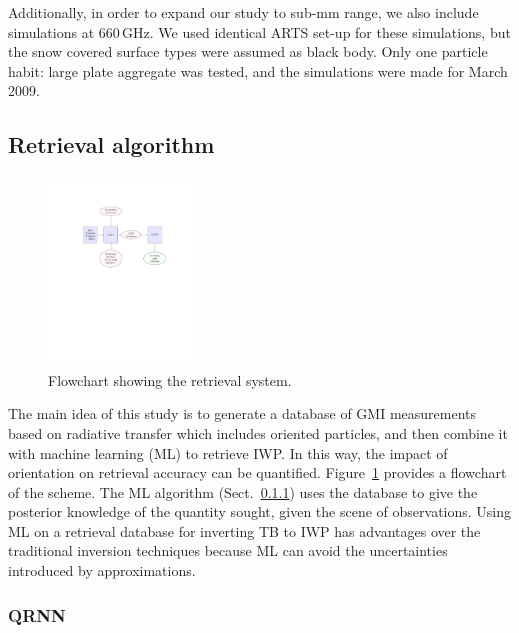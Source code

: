 \documentclass[amt, manuscript]{copernicus}
\begin{document}
Additionally, in order to expand our study to sub-mm range, we also include simulations at 660\,GHz. We used identical ARTS set-up for these simulations, but the snow covered surface types were assumed as black body. Only one particle habit: large plate aggregate was tested, and the simulations were made for March 2009.  




\subsection{Retrieval algorithm}
\label{sec:retrieval_algo}

\begin{figure}[t]
	\includegraphics[trim=100 410 100 125,clip,height = 50mm, ]{Figures/flowchart.pdf}
	\caption{Flowchart showing the retrieval system.}
	\label{fig:flowchart}
\end{figure}

The main idea of this study is to generate a database of GMI measurements based on radiative transfer which includes oriented particles, and then combine it with machine learning (ML) to retrieve IWP. In this way, the impact of orientation on retrieval accuracy can be quantified. Figure~\ref{fig:flowchart} provides a flowchart of the scheme. The ML algorithm (Sect.~\ref{sec:QRNN}) uses the database to give the posterior knowledge of the quantity sought, given the scene of observations. Using ML on a retrieval database for inverting TB to IWP has advantages over the traditional inversion techniques because ML can avoid the uncertainties introduced by approximations. 

\subsubsection{QRNN}
\label{sec:QRNN}
\end{document}
